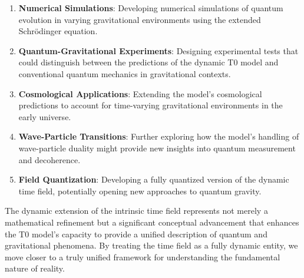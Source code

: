 \documentclass[12pt,a4paper]{article}
\begin{document}
	\begin{enumerate}
		\item \textbf{Numerical Simulations}: Developing numerical simulations of quantum evolution in varying gravitational environments using the extended Schrödinger equation.
		
		\item \textbf{Quantum-Gravitational Experiments}: Designing experimental tests that could distinguish between the predictions of the dynamic T0 model and conventional quantum mechanics in gravitational contexts.
		
		\item \textbf{Cosmological Applications}: Extending the model's cosmological predictions to account for time-varying gravitational environments in the early universe.
		
		\item \textbf{Wave-Particle Transitions}: Further exploring how the model's handling of wave-particle duality might provide new insights into quantum measurement and decoherence.
		
		\item \textbf{Field Quantization}: Developing a fully quantized version of the dynamic time field, potentially opening new approaches to quantum gravity.
	\end{enumerate}
	
	The dynamic extension of the intrinsic time field represents not merely a mathematical refinement but a significant conceptual advancement that enhances the T0 model's capacity to provide a unified description of quantum and gravitational phenomena. By treating the time field as a fully dynamic entity, we move closer to a truly unified framework for understanding the fundamental nature of reality.
	
\end{document}
